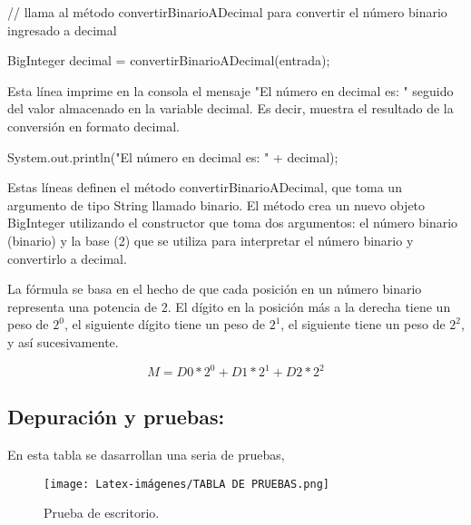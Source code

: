 \begin{javaCode}
 // llama al método convertirBinarioADecimal para convertir el número binario ingresado a decimal
 
            BigInteger decimal = convertirBinarioADecimal(entrada);
            
\end{javaCode}

 Esta línea imprime en la consola el mensaje "El número en decimal es: " seguido del valor almacenado en la variable decimal. Es decir, muestra el resultado de la conversión en formato decimal.

\begin{javaCode}
System.out.println("El número en decimal es: " + decimal);

\end{javaCode}

Estas líneas definen el método convertirBinarioADecimal, que toma un argumento de tipo String llamado binario. El método crea un nuevo objeto BigInteger utilizando el constructor que toma dos argumentos: el número binario (binario) y la base (2) que se utiliza para interpretar el número binario y convertirlo a decimal. 

\begin{javaCode}
lic static BigInteger convertirBinarioADecimal(String binario) {
        return new BigInteger(binario, 2);

\end{javaCode}

\text La fórmula se basa en el hecho de que cada posición en un número binario representa una potencia de 2. El dígito en la posición más a la derecha tiene un peso de \(2^0\), el siguiente dígito tiene un peso de \(2^1\), el siguiente tiene un peso de \(2^2\), y así sucesivamente.
\space

\begin{equation}

M = D0 * 2^0 + D1 * 2^1 + D2 * 2^2

\end{equation}


\subsection{\textbf{Depuración y pruebas:}}
En esta tabla se dasarrollan una seria de pruebas, 
\begin{figure}[H]
    \centering
    \texttt{[image: Latex-imágenes/TABLA DE PRUEBAS.png]}
    \caption{Prueba de escritorio.}
\end{figure}
